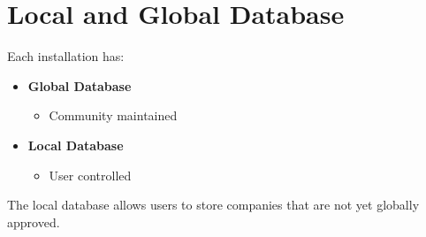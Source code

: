 
\chapter{Local and Global Database}

Each installation has:
\begin{itemize}
	\item \textbf{Global Database}
		\begin{itemize}
			\item Community maintained
		\end{itemize}
	\item \textbf{Local Database}
		\begin{itemize}
			\item User controlled
		\end{itemize}
\end{itemize}

The local database allows users to store companies that are not yet globally approved.

\sentinelchapterend
